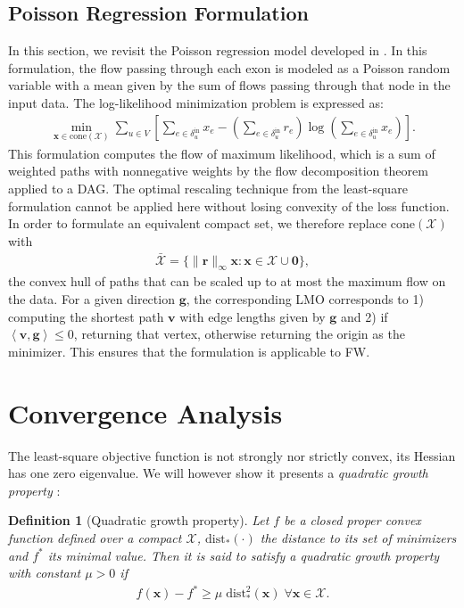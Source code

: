 \documentclass{ecai}
\newtheorem{definition}{Definition}
\newcommand{\innp}[2]{\left\langle #1, #2 \right\rangle}
\newcommand{\vx}{\mathbf{x}}
\newcommand{\vvv}{\mathbf{v}}
\newcommand{\vr}{\mathbf{r}}
\newcommand{\Xset}{{\ensuremath{\mathcal{X}}}\xspace}
\begin{document}
\subsection{Poisson Regression Formulation}

In this section, we revisit the Poisson regression model developed in \cite{bernard2014efficient}.
In this formulation, the flow passing through each exon is modeled as a Poisson random variable with a mean given by the sum of flows passing through that node in the input data.
The log-likelihood minimization problem is expressed as:
\begin{align*}
\min_{\vx \in \mathrm{cone}(\Xset)} \sum_{u \in V} \left[ \sum_{e \in \delta^{\mathrm{in}}_u} x_e - \left(\sum_{e \in \delta^{\mathrm{in}}_u} r_e\right) \log\left(\sum_{e \in \delta^{\mathrm{in}}_u} x_e\right)\right].
\end{align*}
This formulation computes the flow of maximum likelihood, which is a sum of weighted paths with nonnegative weights by the flow decomposition theorem applied to a DAG.
The optimal rescaling technique from the least-square formulation cannot be applied here without losing convexity of the loss function.
In order to formulate an equivalent compact set, we therefore replace $\mathrm{cone}(\Xset)$ with
\begin{align*}
\bar{\Xset} = \{\|\vr\|_{\infty} \vx : \vx \in \Xset \cup \mathbf{0}\},
\end{align*}
the convex hull of paths that can be scaled up to at most the maximum flow on the data.
For a given direction $\mathbf{g}$, the corresponding LMO corresponds to 1) computing the shortest path $\vvv$ with edge lengths given by $\mathbf{g}$ and 2) if $\innp{\vvv}{\mathbf{g}} \leq 0$, returning that vertex, otherwise returning the origin as the minimizer.
This ensures that the formulation is applicable to FW.

\section{Convergence Analysis}

The least-square objective function is not strongly nor strictly convex, its Hessian has one zero eigenvalue.
We will however show it presents a \emph{quadratic growth property} \cite{karimi2016linear}:
\begin{definition}[Quadratic growth property]\label{def:quadgrowth}
Let $f$ be a closed proper convex function defined over a compact \Xset{}, $\mathrm{dist}_*(\cdot)$ the distance to its set of minimizers and $f^*$ its minimal value.
Then it is said to satisfy a quadratic growth property with constant $\mu > 0$ if
\begin{align*}
f(\vx) - f^* \geq \mu\; \mathrm{dist}^2_*(\vx) \; \forall \vx \in \Xset{}.
\end{align*}
\end{definition}
\end{document}
